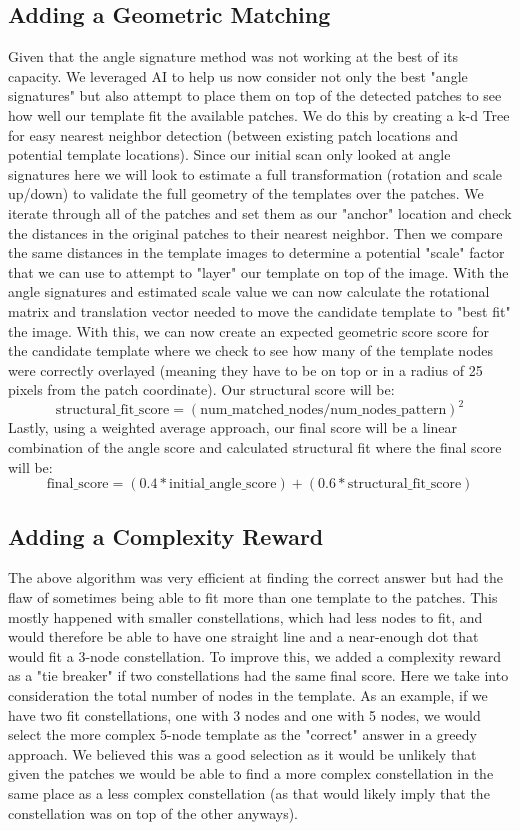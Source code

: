 \documentclass[a4paper,11pt]{article}
\begin{document}
	\subsection{Adding a Geometric Matching}
	Given that the angle signature method was not working at the best of its capacity. We leveraged AI to help us now consider not only the best "angle signatures" but also attempt to place them on top of the detected patches to see how well our template fit the available patches. We do this by creating a k-d Tree for easy nearest neighbor detection (between existing patch locations and potential template locations). Since our initial scan only looked at angle signatures here we will look to estimate a full transformation (rotation and scale up/down) to validate the full geometry of the templates over the patches. We iterate through all of the patches and set them as our "anchor" location and check the distances in the original patches to their nearest neighbor. Then we compare the same distances in the template images to determine a potential "scale" factor that we can use to attempt to "layer" our template on top of the image. With the angle signatures and estimated scale value we can now calculate the rotational matrix and translation vector needed to move the candidate template to "best fit" the image. With this, we can now create an expected geometric score score for the candidate template where we check to see how many of the template nodes were correctly overlayed (meaning they have to be on top or in a radius of 25 pixels from the patch coordinate). Our structural score will be: \[\text{structural\_fit\_score} = (\text{num\_matched\_nodes} / \text{num\_nodes\_pattern})^2\] Lastly, using a weighted average approach, our final score will be a linear combination of the angle score and calculated structural fit where the final score will be: \[\text{final\_score} = (0.4 * \text{initial\_angle\_score}) + (0.6 * \text{structural\_fit\_score})\]
	
	\subsection{Adding a Complexity Reward}
	The above algorithm was very efficient at finding the correct answer but had the flaw of sometimes being able to fit more than one template to the patches. This mostly happened with smaller constellations, which had less nodes to fit, and would therefore be able to have one straight line and a near-enough dot that would fit a 3-node constellation. To improve this, we added a complexity reward as a "tie breaker" if two constellations had the same final score. Here we take into consideration the total number of nodes in the template. As an example, if we have two fit constellations, one with 3 nodes and one with 5 nodes, we would select the more complex 5-node template as the "correct" answer in a greedy approach. We believed this was a good selection as it would be unlikely that given the patches we would be able to find a more complex constellation in the same place as a less complex constellation (as that would likely imply that the constellation was on top of the other anyways).
	
	
	
	
	
	
\end{document}
